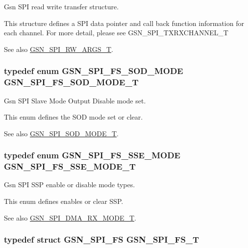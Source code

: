 Gsn SPI read write transfer structure. 

This structure defines a SPI data pointer and call back function information for each channel. For more detail, please see GSN\_\-SPI\_\-TXRXCHANNEL\_\-T

\begin{DoxySeeAlso}{See also}
\hyperlink{a00655_ga9da696c71bee0cdc5b3365d5d055e389}{GSN\_\-SPI\_\-RW\_\-ARGS\_\-T}. 
\end{DoxySeeAlso}
\hypertarget{a00655_gaa0f62d38ee68880a4e3bb673a05d293d}{
\subsubsection[{GSN\_\-SPI\_\-FS\_\-SOD\_\-MODE\_\-T}]{\setlength{\rightskip}{0pt plus 5cm}typedef enum {\bf GSN\_\-SPI\_\-FS\_\-SOD\_\-MODE}  {\bf GSN\_\-SPI\_\-FS\_\-SOD\_\-MODE\_\-T}}}
\label{a00655_gaa0f62d38ee68880a4e3bb673a05d293d}


Gsn SPI Slave Mode Output Disable mode set. 

This enum defines the SOD mode set or clear. \begin{DoxySeeAlso}{See also}
\hyperlink{a00655_ga5662413f1ff6b81e835e7c5412916d4b}{GSN\_\-SPI\_\-SOD\_\-MODE\_\-T}. 
\end{DoxySeeAlso}
\hypertarget{a00655_ga05ccf14c3c0d97e7e9fb2d52bf5081de}{
\subsubsection[{GSN\_\-SPI\_\-FS\_\-SSE\_\-MODE\_\-T}]{\setlength{\rightskip}{0pt plus 5cm}typedef enum {\bf GSN\_\-SPI\_\-FS\_\-SSE\_\-MODE}  {\bf GSN\_\-SPI\_\-FS\_\-SSE\_\-MODE\_\-T}}}
\label{a00655_ga05ccf14c3c0d97e7e9fb2d52bf5081de}


Gsn SPI SSP enable or disable mode types. 

This enum defines enables or clear SSP. \begin{DoxySeeAlso}{See also}
\hyperlink{a00655_ga884b22be3cf70e4b96a0cda9b704390a}{GSN\_\-SPI\_\-DMA\_\-RX\_\-MODE\_\-T}. 
\end{DoxySeeAlso}
\hypertarget{a00655_gac18ad73594795ef9c6caa997e3b92549}{
\subsubsection[{GSN\_\-SPI\_\-FS\_\-T}]{\setlength{\rightskip}{0pt plus 5cm}typedef struct {\bf GSN\_\-SPI\_\-FS}  {\bf GSN\_\-SPI\_\-FS\_\-T}}}
\label{a00655_gac18ad73594795ef9c6caa997e3b92549}


